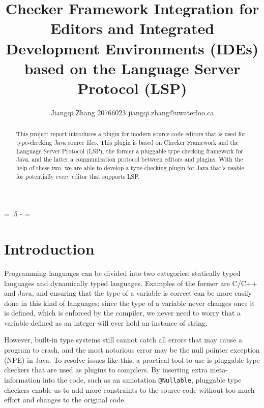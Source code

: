 \documentclass{article}
\newcommand{\ls}[1]
    {\dimen0=\fontdimen6\the\font\lineskip=#1\dimen0
     \advance\lineskip.5\fontdimen5\the\font
     \advance\lineskip-\dimen0
     \lineskiplimit=0.9\lineskip
     \baselineskip=\lineskip
     \advance\baselineskip\dimen0
     \normallineskip\lineskip\normallineskiplimit\lineskiplimit
     \normalbaselineskip\baselineskip
     \ignorespaces}
\begin{document}


\title{Checker Framework Integration for Editors and Integrated Development Environments (IDEs) based on the Language Server Protocol (LSP)}
\author{Jiangqi Zhang 20766023 jiangqi.zhang@uwaterloo.ca \\
}

\date{}
\maketitle

\thispagestyle{plain}
\setcounter{page}{1}

\begin{abstract}

This project report introduces a plugin for modern source code editors that is used for type-checking Java source files. This plugin is based on Checker Framework\cite{cf} and the Language Server Protocol (LSP)\cite{lsp}, the former a pluggable type checking framework for Java, and the latter a communication protocol between editors and plugins. With the help of these two, we are able to develop a type-checking plugin for Java that's usable for potentially every editor that supports LSP.

\end{abstract}

\ls{1.2}

\section{Introduction}


Programming languages can be divided into two categories: statically typed languages and dynamically typed languages. Examples of the former are C/C++ and Java, and ensuring that the type of a variable is correct can be more easily done in this kind of languages; since the type of a variable never changes once it is defined, which is enforced by the compiler, we never need to worry that a variable defined as an integer will ever hold an instance of string.

However, built-in type systems still cannot catch all errors that may cause a program to crash, and the most notorious error may be the null pointer exception (NPE) in Java.  To resolve issues like this, a practical tool to use is pluggable type checkers\cite{cf-ori} that are used as plugins to compilers.  By inserting extra meta-information into the code, such as an annotation \verb|@Nullable|, pluggable type checkers enable us to add more constraints to the source code without too much effort and changes to the original code.
\end{document}
